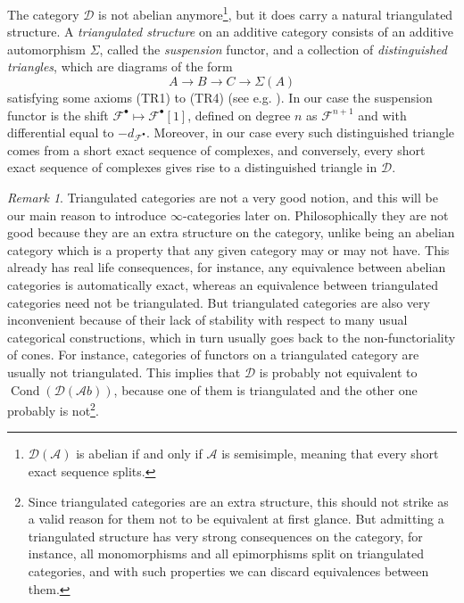 \documentclass[11pt,A4]{article}
\theoremstyle{plain}
\theoremstyle{definition}
\theoremstyle{remark}
\newtheorem{rem}[thm]{Remark}
\newcommand{\1}{\mathbbm{1}}
\newcommand{\F}{\mathcal{F}}
\newcommand{\Ab}{\mathscr{A}b}
\newcommand{\D}{\mathscr{D}}
\DeclareMathOperator{\Cond}{Cond}
\newcommand{\grd}{^{\bullet}}
\begin{document}
The category $\D$ is not abelian anymore\footnote{$\D(\mathscr{A})$ is abelian if and only if $\mathscr{A}$ is semisimple, meaning that every short exact sequence splits.}, but it does carry a natural triangulated structure.
A \textit{triangulated structure} on an additive category consists of an additive automorphism $\Sigma$, called the \textit{suspension} functor, and a collection of \textit{distinguished triangles}, which are diagrams of the form
\[ A\to B\to C\to\Sigma(A) \]
satisfying some axioms (TR1) to (TR4) (see e.g. \cite{gm03}).
In our case the suspension functor is the shift $\F\grd\mapsto \F\grd[1]$, defined on degree $n$ as $\F^{n+1}$ and with differential equal to $-d_{\F\grd}$.
Moreover, in our case every such distinguished triangle comes from a short exact sequence of complexes, and conversely, every short exact sequence of complexes gives rise to a distinguished triangle in $\D$.

\begin{rem}
    Triangulated categories are not a very good notion, and this will be our main reason to introduce $\infty$-categories later on.
    Philosophically they are not good because they are an extra structure on the category, unlike being an abelian category which is a property that any given category may or may not have.
    This already has real life consequences, for instance, any equivalence between abelian categories is automatically exact, whereas an equivalence between triangulated categories need not be triangulated.
    But triangulated categories are also very inconvenient because of their lack of stability with respect to many usual categorical constructions, which in turn usually goes back to the non-functoriality of cones.
    For instance, categories of functors on a triangulated category are usually not triangulated.
    This implies that $\D$ is probably not equivalent to $\Cond(\D(\Ab))$, because one of them is triangulated and the other one probably is not\footnote{Since triangulated categories are an extra structure, this should not strike as a valid reason for them not to be equivalent at first glance. But admitting a triangulated structure has very strong consequences on the category, for instance, all monomorphisms and all epimorphisms split on triangulated categories, and with such properties we can discard equivalences between them.}.
\end{rem}
\end{document}
